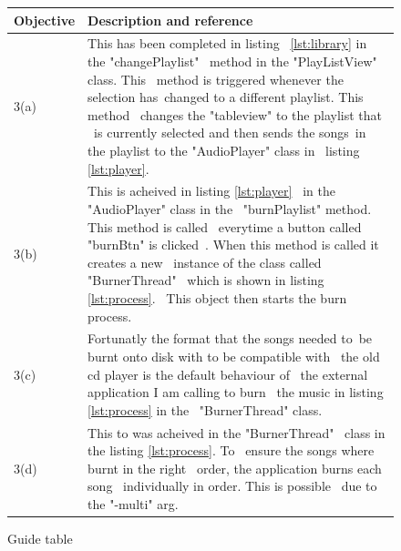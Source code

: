 \documentclass{article}
\begin{document}
\begin{figure}[H]
    \begin{tabular} {| p{2cm} | p{10cm} |}
        \hline
        \textbf{Objective}   &         \textbf{Description and reference}   \\ \hline
        3(a)                 &This has been completed in listing            \
                              \ref{lst:library} in the "changePlaylist"     \
                              method in the "PlayListView" class. This      \
                              method is triggered whenever the selection has\
                              changed to a different playlist. This method  \
                              changes the "tableview" to the playlist that  \
                              is currently selected and then sends the songs\
                              in the playlist to the "AudioPlayer" class in \
                              listing \ref{lst:player}.                     \\ \hline
        3(b)                 &This is acheived in listing \ref{lst:player}  \
                              in the "AudioPlayer" class in the             \
                              "burnPlaylist" method. This method is called  \
                              everytime a button called "burnBtn" is clicked\
                              . When this method is called it creates a new \
                              instance of the class called "BurnerThread"   \
                              which is shown in listing \ref{lst:process}.  \
                              This object then starts the burn process.     \\ \hline
        3(c)                 &Fortunatly the format that the songs needed to\
                              be burnt onto disk with to be compatible with \
                              the old cd player is the default behaviour of \
                              the external application I am calling to burn \
                              the music in listing \ref{lst:process} in the \
                              "BurnerThread" class.                         \\ \hline
        3(d)                 &This to was acheived in the "BurnerThread"    \
                               class in the listing \ref{lst:process}. To   \
                               ensure the songs where burnt in the right    \
                               order, the application burns each song       \
                               individually in order. This is possible      \
                               due to the "-multi" arg.                     \\ \hline
    \end{tabular}
    \caption{Guide table} \label{fig:guideTable}
\end{figure}
\end{document}
